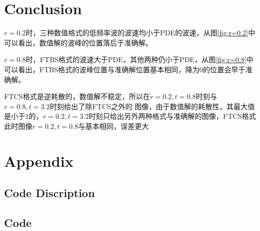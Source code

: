 \documentclass{article}
\begin{document}
\section{Conclusion}

$r=0.2$时，三种数值格式的低频率波的波速均小于PDE的波速，从图\ref{fig:r=0.2}中可以看出，数值解的波峰的位置落后于准确解。

$r=0.8$时，FTBS格式的波速大于PDE，其他两种仍小于PDE，从图\ref{fig:r=0.8}中可以看出，FTBS格式的波峰位置与准确解位置基本相同，降为0的位置会早于准确解。

FTCS格式是逆耗散的，数值解不稳定，所以在$r=0.2,t=0.8$时刻与$r=0.8,t=3.2$时刻给出了除FTCS之外的
图像，由于数值解的耗散性，其最大值是小于1的，$r=0.2,t=3.2$时刻只给出另外两种格式与准确解的图像，FTCS格式此时图像$r=0.2,t=0.8$与基本相同，误差更大
\section{Appendix}
\subsection{Code Discription}

\subsection{Code}

\end{document}
